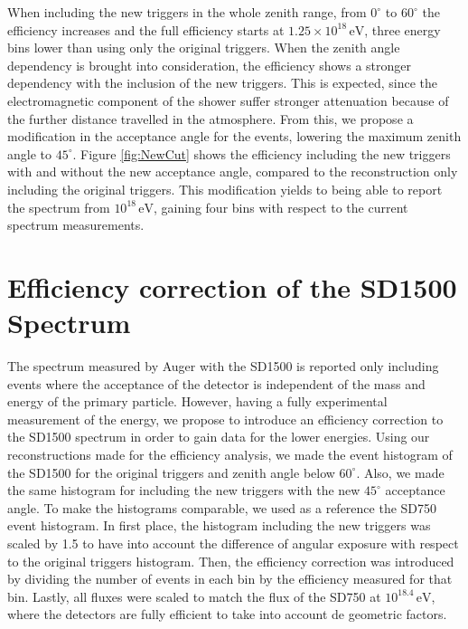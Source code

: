 \documentclass[12pt,a4paper]{article}
\newcommand{\eV}{\, \mathrm{eV}}
\begin{document}
When including the new triggers in the whole zenith range, from $0^{\circ}$ to $60^{\circ}$ the efficiency increases and the full efficiency starts at $1.25\times10^{18}\eV$, three energy bins lower than using only the original triggers. When the zenith angle dependency is brought into consideration, the efficiency shows a stronger dependency with the inclusion of the new triggers. This is expected, since the electromagnetic component of the shower suffer stronger attenuation because of the further distance travelled in the atmosphere. From this, we propose a modification in the acceptance angle for the events, lowering the maximum zenith angle to $45^{\circ}$. Figure \ref{fig:NewCut} shows the efficiency including the new triggers with and without the new acceptance angle, compared to the reconstruction only including the original triggers. This modification yields to being able to report the spectrum from $10^{18}\eV$, gaining four bins with respect to the current spectrum measurements.



\section{Efficiency correction of the SD1500 Spectrum}
\label{sec:spectrum}

The spectrum measured by Auger with the SD1500 is reported only including events where the acceptance of the detector is independent of the mass and energy of the primary particle. However, having a fully experimental measurement of the energy, we propose to introduce an efficiency correction to the SD1500 spectrum in order to gain data for the lower energies.
Using our reconstructions made for the efficiency analysis, we made the event histogram of the SD1500 for the original triggers and zenith angle below $60^{\circ}$. Also, we made the same histogram for including the new triggers with the new $45^{\circ}$ acceptance angle. To make the histograms comparable, we used as a reference the SD750 event histogram. In first place, the histogram including the new triggers was scaled by 1.5 to have into account the difference of angular exposure with respect to the original triggers histogram. Then, the efficiency correction was introduced by dividing the number of events in each bin by the efficiency measured for that bin. Lastly, all fluxes were scaled to match the flux of the SD750 at $10^{18.4}\eV$, where the detectors are fully efficient to take into account de geometric factors. 
\end{document}
